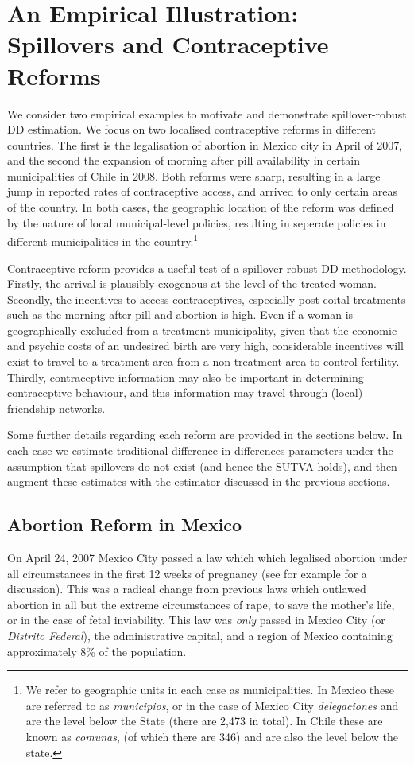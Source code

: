 \section{An Empirical Illustration: Spillovers and Contraceptive Reforms}
We consider two empirical examples to motivate and demonstrate spillover-robust 
DD estimation.
We focus on two localised contraceptive reforms in different countries. The first
is the legalisation of abortion in Mexico city in April of 2007, and the second
the expansion of morning after pill availability in certain municipalities of 
Chile in 2008.  Both reforms were sharp, resulting in a large jump in reported
rates of contraceptive access, and arrived to only certain areas of the country.
In both cases, the geographic location of the reform was defined by the nature
of local municipal-level policies, resulting in seperate policies in different
municipalities in the country.\footnote{We refer to geographic units in each case
as municipalities.  In Mexico these are referred to as \emph{municipios}, or in 
the case of Mexico City \emph{delegaciones} and are the level below the State 
(there are 2,473 in total).  In Chile these are known as \emph{comunas}, (of 
which there are 346) and are also the level below the state.}

Contraceptive reform provides a useful test of a spillover-robust DD methodology.
Firstly, the arrival is plausibly exogenous at the level of the treated woman.
Secondly, the incentives to access contraceptives, especially post-coital 
treatments such as the morning after pill and abortion is high.  Even if a woman
is geographically excluded from a treatment municipality, given that the economic
and psychic costs of an undesired birth are very high, considerable incentives
will exist to travel to a treatment area from a non-treatment area to control
fertility.  Thirdly, contraceptive information may also be important in
determining contraceptive behaviour, and this information may travel through
(local) friendship networks.

Some further details regarding each reform are provided in the sections below.
In each case we estimate traditional difference-in-differences parameters under
the assumption that spillovers do not exist (and hence the SUTVA holds), and
then augment these estimates with the estimator discussed in the previous
sections.

\subsection{Abortion Reform in Mexico}
On April 24, 2007 Mexico City passed a law which which legalised abortion 
under all circumstances in the first 12 weeks of pregnancy (see for example
\citet{Fraser2014} for a discussion).  This was a radical change from previous 
laws which outlawed abortion in all but the extreme circumstances of rape, 
to save the mother's life, or in the case of fetal inviability.  This law was 
\emph{only} passed in Mexico City (or \emph{Distrito Federal}), the 
administrative capital, and a region of Mexico containing approximately 8\% 
of the population.

